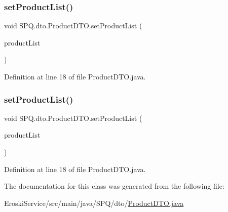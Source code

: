\mbox{\label{class_s_p_q_1_1dto_1_1_product_d_t_o_a79be4bcc432ec5c17c5873e868aa2e4f}} 
\subsubsection{\texorpdfstring{set\+Product\+List()}{setProductList()}\hspace{0.1cm}{\footnotesize\ttfamily [1/2]}}
{\footnotesize\ttfamily void S\+P\+Q.\+dto.\+Product\+D\+T\+O.\+set\+Product\+List (\begin{DoxyParamCaption}\item[{Array\+List$<$ \mbox{\hyperlink{class_s_p_q_1_1data_1_1_product}{Product}} $>$}]{product\+List }\end{DoxyParamCaption})}



Definition at line 18 of file Product\+D\+T\+O.\+java.

\mbox{\label{class_s_p_q_1_1dto_1_1_product_d_t_o_a79be4bcc432ec5c17c5873e868aa2e4f}} 
\subsubsection{\texorpdfstring{set\+Product\+List()}{setProductList()}\hspace{0.1cm}{\footnotesize\ttfamily [2/2]}}
{\footnotesize\ttfamily void S\+P\+Q.\+dto.\+Product\+D\+T\+O.\+set\+Product\+List (\begin{DoxyParamCaption}\item[{Array\+List$<$ \mbox{\hyperlink{class_s_p_q_1_1data_1_1_product}{Product}} $>$}]{product\+List }\end{DoxyParamCaption})}



Definition at line 18 of file Product\+D\+T\+O.\+java.



The documentation for this class was generated from the following file\+:\begin{DoxyCompactItemize}
\item 
Eroski\+Service/src/main/java/\+S\+P\+Q/dto/\mbox{\hyperlink{_eroski_service_2src_2main_2java_2_s_p_q_2dto_2_product_d_t_o_8java}{Product\+D\+T\+O.\+java}}\end{DoxyCompactItemize}
